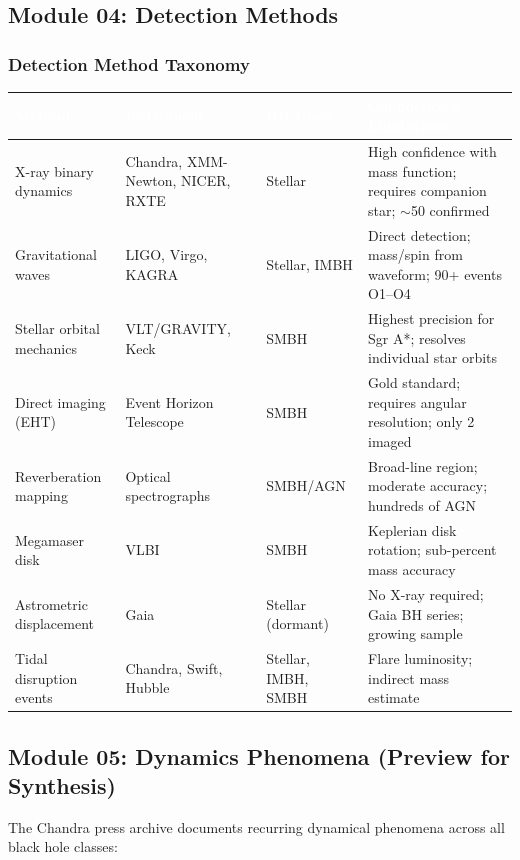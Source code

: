 \documentclass[11pt,letterpaper]{article}
\newcommand{\tableheader}[1]{\textbf{\sffamily\textcolor{white}{#1}}}
\begin{document}
\subsection{Module 04: Detection Methods}

\subsubsection{Detection Method Taxonomy}

\begin{center}
\begin{tabularx}{\textwidth}{L{3cm}L{2.5cm}L{2.5cm}X}
\toprule
{}
\tableheader{Method} & \tableheader{Instrument} & \tableheader{BH Class} & \tableheader{Confidence \& Limitations} \\
\midrule
X-ray binary dynamics & Chandra, XMM-Newton, NICER, RXTE & Stellar & High confidence with mass function; requires companion star; $\sim$50 confirmed \\
Gravitational waves & LIGO, Virgo, KAGRA & Stellar, IMBH & Direct detection; mass/spin from waveform; 90+ events O1--O4 \\
Stellar orbital mechanics & VLT/GRAVITY, Keck & SMBH & Highest precision for Sgr A*; resolves individual star orbits \\
Direct imaging (EHT) & Event Horizon Telescope & SMBH & Gold standard; requires angular resolution; only 2 imaged \\
Reverberation mapping & Optical spectrographs & SMBH/AGN & Broad-line region; moderate accuracy; hundreds of AGN \\
Megamaser disk & VLBI & SMBH & Keplerian disk rotation; sub-percent mass accuracy \\
Astrometric displacement & Gaia & Stellar (dormant) & No X-ray required; Gaia BH series; growing sample \\
Tidal disruption events & Chandra, Swift, Hubble & Stellar, IMBH, SMBH & Flare luminosity; indirect mass estimate \\
\bottomrule
\end{tabularx}
\end{center}

\subsection{Module 05: Dynamics Phenomena (Preview for Synthesis)}

The Chandra press archive documents recurring dynamical phenomena across all black hole classes:
\end{document}
